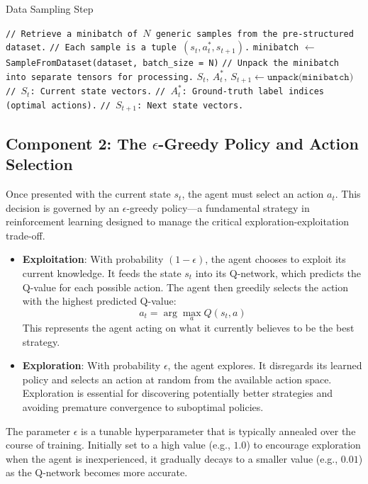 \documentclass{report}
\begin{document}
\begin{algorithm}[H]
\caption{Data Sampling Step}
\begin{algorithmic}[1]
\State \texttt{// Retrieve a minibatch of $N$ generic samples from the pre-structured dataset.}
\State \texttt{// Each sample is a tuple $(s_t, a^*_t, s_{t+1})$.}
\State \texttt{minibatch} $\gets$ \texttt{SampleFromDataset(dataset, batch\_size = N)}
\State \texttt{// Unpack the minibatch into separate tensors for processing.}
\State $S_t,\ A^*_t,\ S_{t+1} \gets \texttt{unpack(minibatch)}$
\State \texttt{// $S_t$: Current state vectors.}
\State \texttt{// $A^*_t$: Ground-truth label indices (optimal actions).}
\State \texttt{// $S_{t+1}$: Next state vectors.}
\end{algorithmic}
\end{algorithm}

\subsection{\texorpdfstring{Component 2: The $\epsilon$-Greedy Policy and Action Selection}{Component 2: The epsilon-Greedy Policy and Action Selection}}

Once presented with the current state $s_t$, the agent must select an action $a_t$. This decision is governed by an $\epsilon$-greedy policy—a fundamental strategy in reinforcement learning designed to manage the critical exploration-exploitation trade-off.

\begin{itemize}
    \item \textbf{Exploitation}: With probability $(1 - \epsilon)$, the agent chooses to exploit its current knowledge. It feeds the state $s_t$ into its Q-network, which predicts the Q-value for each possible action. The agent then greedily selects the action with the highest predicted Q-value:
    \[
    a_t = \arg\max_a Q(s_t, a)
    \]
    This represents the agent acting on what it currently believes to be the best strategy.

    \item \textbf{Exploration}: With probability $\epsilon$, the agent explores. It disregards its learned policy and selects an action at random from the available action space. Exploration is essential for discovering potentially better strategies and avoiding premature convergence to suboptimal policies.
\end{itemize}

The parameter $\epsilon$ is a tunable hyperparameter that is typically annealed over the course of training. Initially set to a high value (e.g., $1.0$) to encourage exploration when the agent is inexperienced, it gradually decays to a smaller value (e.g., $0.01$) as the Q-network becomes more accurate.
\end{document}
